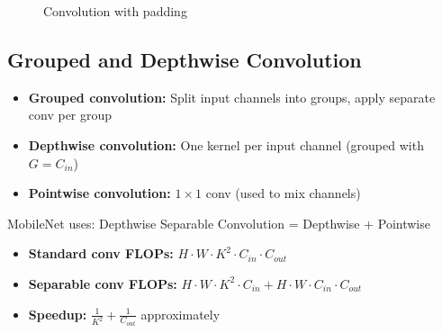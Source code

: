 \begin{figure}[htbp]
    \centering
    \caption{Convolution with padding}
    \label{fig:conv_padding}
\end{figure}

\subsection{Grouped and Depthwise Convolution}

\begin{itemize}
    \item \textbf{Grouped convolution:} Split input channels into groups, apply separate conv per group
    \item \textbf{Depthwise convolution:} One kernel per input channel (grouped with $G = C_{in}$)
    \item \textbf{Pointwise convolution:} $1\times1$ conv (used to mix channels)
\end{itemize}

MobileNet uses: Depthwise Separable Convolution = Depthwise + Pointwise

\begin{properties}
\begin{itemize}
    \item \textbf{Standard conv FLOPs:} $H \cdot W \cdot K^2 \cdot C_{in} \cdot C_{out}$
    \item \textbf{Separable conv FLOPs:} $H \cdot W \cdot K^2 \cdot C_{in} + H \cdot W \cdot C_{in} \cdot C_{out}$
    \item \textbf{Speedup:} $\frac{1}{K^2} + \frac{1}{C_{out}}$ approximately
\end{itemize}
\end{properties}

